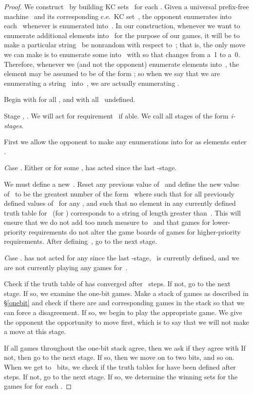 \documentclass{LMCS}
\newcommand{\0}{\mathbf{0}}
\newcommand{\ce}{c.e.\ }
\newcommand{\<}{\langle}
\renewcommand{\>}{\rangle}
\begin{document}
\begin{proof}
We construct~ by building KC sets~ for each .  Given a
universal prefix-free machine~ and its corresponding \ce KC set~, the
opponent enumerates  into each~ whenever
 is enumerated into~.  In our construction,
whenever we want to enumerate additional elements into~ for the purpose
of our games, it will be to make a particular string~ be nonrandom with
respect to~; that is, the only move we can make is to enumerate some
 into~ with  so that 
changes from a~1 to a~0.  Therefore, whenever we (and not the opponent)
enumerate elements into~, the element may be assumed to be of the form
; so when we say that we are enumerating a
string~ into~, we are actually enumerating .

Begin with  for all , and with all~
undefined.

Stage , .  We will act for
requirement~ if able.  We call all stages of the form  {\em i-stages}.

First we allow the opponent to make any enumerations into  for
 as elements enter .

\medskip
{\emph Case .} Either  or for some ,  has acted
since the last -stage.

We must define a new~.  Reset any previous value of~
and define the new value of~ to be the greatest number of the
form~ where  such that  for all
previously defined values of~ for any , and such
that no element in any currently defined truth table for~ (for )
corresponds to a string of length greater than~.  This will ensure that we
do not add too much measure to~ and that games for lower-priority
requirements do not alter the game boards of games for higher-priority
requirements.  After defining~, go to the next stage.

\medskip
{\emph Case .}  has not acted for any  since the last
-stage,~ is currently defined, and we are not currently
playing any games for~.

Check if the truth table of  has converged after~ steps.  If
not, go to the next stage.  If so, we examine the one-bit games.  Make a
stack of games as described in \S\ref{onebit} and check if there are  and corresponding games in the stack so that we can force a disagreement.
If so, we begin to play the appropriate game.  We give the opponent the
opportunity to move first, which is to say that we will not make a move at
this stage.

If all games throughout the one-bit stack agree, then we ask if they agree
with   If not, then go to the next stage.  If so, then we move on to
two bits, and so on.  When we get to~ bits, we check if the truth tables
for  have been defined after~ steps.  If not, go to the next
stage.  If so, we determine the winning sets for the games  for  for each .


\end{proof}
\end{document}
